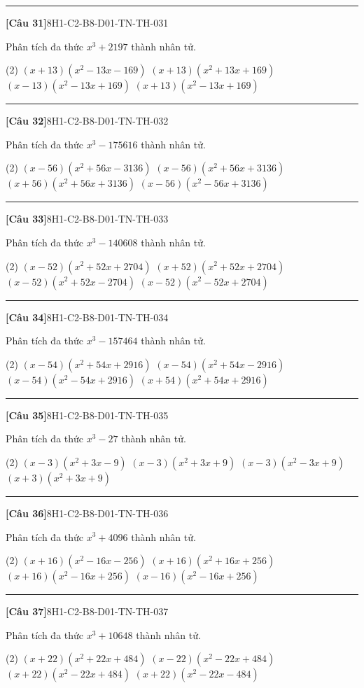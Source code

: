 \documentclass[12pt,a4paper]{article}
\newif\ifloigiai
\newenvironment{cauhoi}[2]{%
  \par\medskip\noindent\rule{\textwidth}{0.4pt}\par\nopagebreak
  \noindent\textbf{[#1]}\hfill{\scriptsize\ttfamily #2}\par\nopagebreak\smallskip}{\par}
\newcommand{\dapan}[1]{\ifloigiai\par\smallskip\noindent\textit{Đáp án:} \textbf{#1}\par\fi}
\begin{document}
\begin{cauhoi}{Câu 31}{8H1-C2-B8-D01-TN-TH-031}
Phân tích đa thức $x^{3}+2197$ thành nhân tử.
\begin{tasks}(2)
\task $(x+13)(x^{2}-13x-169)$
\task $(x+13)(x^{2}+13x+169)$
\task $(x-13)(x^{2}-13x+169)$
\task $(x+13)(x^{2}-13x+169)$
\end{tasks}
\dapan{D}
\end{cauhoi}
\begin{cauhoi}{Câu 32}{8H1-C2-B8-D01-TN-TH-032}
Phân tích đa thức $x^{3}-175616$ thành nhân tử.
\begin{tasks}(2)
\task $(x-56)(x^{2}+56x-3136)$
\task $(x-56)(x^{2}+56x+3136)$
\task $(x+56)(x^{2}+56x+3136)$
\task $(x-56)(x^{2}-56x+3136)$
\end{tasks}
\dapan{B}
\end{cauhoi}
\begin{cauhoi}{Câu 33}{8H1-C2-B8-D01-TN-TH-033}
Phân tích đa thức $x^{3}-140608$ thành nhân tử.
\begin{tasks}(2)
\task $(x-52)(x^{2}+52x+2704)$
\task $(x+52)(x^{2}+52x+2704)$
\task $(x-52)(x^{2}+52x-2704)$
\task $(x-52)(x^{2}-52x+2704)$
\end{tasks}
\dapan{A}
\end{cauhoi}
\begin{cauhoi}{Câu 34}{8H1-C2-B8-D01-TN-TH-034}
Phân tích đa thức $x^{3}-157464$ thành nhân tử.
\begin{tasks}(2)
\task $(x-54)(x^{2}+54x+2916)$
\task $(x-54)(x^{2}+54x-2916)$
\task $(x-54)(x^{2}-54x+2916)$
\task $(x+54)(x^{2}+54x+2916)$
\end{tasks}
\dapan{A}
\end{cauhoi}
\begin{cauhoi}{Câu 35}{8H1-C2-B8-D01-TN-TH-035}
Phân tích đa thức $x^{3}-27$ thành nhân tử.
\begin{tasks}(2)
\task $(x-3)(x^{2}+3x-9)$
\task $(x-3)(x^{2}+3x+9)$
\task $(x-3)(x^{2}-3x+9)$
\task $(x+3)(x^{2}+3x+9)$
\end{tasks}
\dapan{B}
\end{cauhoi}
\begin{cauhoi}{Câu 36}{8H1-C2-B8-D01-TN-TH-036}
Phân tích đa thức $x^{3}+4096$ thành nhân tử.
\begin{tasks}(2)
\task $(x+16)(x^{2}-16x-256)$
\task $(x+16)(x^{2}+16x+256)$
\task $(x+16)(x^{2}-16x+256)$
\task $(x-16)(x^{2}-16x+256)$
\end{tasks}
\dapan{C}
\end{cauhoi}
\begin{cauhoi}{Câu 37}{8H1-C2-B8-D01-TN-TH-037}
Phân tích đa thức $x^{3}+10648$ thành nhân tử.
\begin{tasks}(2)
\task $(x+22)(x^{2}+22x+484)$
\task $(x-22)(x^{2}-22x+484)$
\task $(x+22)(x^{2}-22x+484)$
\task $(x+22)(x^{2}-22x-484)$
\end{tasks}
\dapan{C}
\end{cauhoi}
\end{document}
